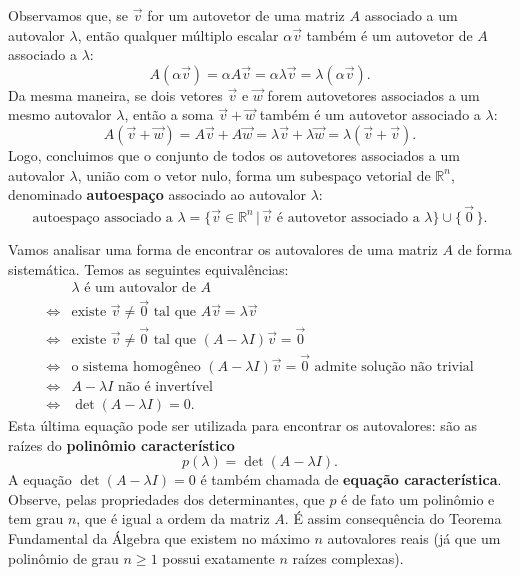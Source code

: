 Observamos que, se $\vec{v}$ for um autovetor de uma matriz $A$ associado a um autovalor $\lambda$, então qualquer múltiplo escalar $\alpha \vec{v}$ também é um autovetor de $A$ associado a $\lambda$:
\begin{equation}
A (\alpha \vec{v}) = \alpha A \vec{v} = \alpha \lambda \vec{v} = \lambda (\alpha \vec{v}).
\end{equation} Da mesma maneira, se dois vetores $\vec{v}$ e $\vec{w}$ forem autovetores associados a um mesmo autovalor $\lambda$, então a soma $\vec{v} + \vec{w}$ também é um autovetor associado a $\lambda$:
\begin{equation}
A (\vec{v} + \vec{w}) = A \vec{v} + A \vec{w} =  \lambda \vec{v} + \lambda \vec{w} = \lambda (\vec{v} + \vec{v}).
\end{equation} Logo, concluimos que o conjunto de todos os autovetores associados a um autovalor $\lambda$, união com o vetor nulo, forma um subespaço vetorial de $\mathbb{R}^n$, denominado \textbf{autoespaço} associado ao autovalor $\lambda$:
\begin{equation}
\text{autoespaço associado a } \lambda = \big\{ \vec{v} \in \mathbb{R}^n \, | \, \vec{v} \text{ é autovetor associado a } \lambda \big\} \cup \{\, \vec{0}\, \}.
\end{equation}

Vamos analisar uma forma de encontrar os autovalores de uma matriz $A$ de forma sistemática. Temos as seguintes equivalências:
\begin{align*}
& \lambda \text{ é um autovalor de $A$} \\
\iff & \text{existe } \vec{v} \neq \vec{0} \text{ tal que } A \vec{v} = \lambda \vec{v} \\
\iff & \text{existe } \vec{v} \neq \vec{0} \text{ tal que } (A - \lambda I)\vec{v} = \vec{0} \\
\iff & \text{o sistema homogêneo } (A - \lambda I)\vec{v} = \vec{0} \text{ admite solução não trivial} \\
\iff & A - \lambda I \text{ não é invertível} \\
\iff & \det (A - \lambda I) = 0.
\end{align*}
Esta última equação pode ser utilizada para encontrar os autovalores: são as raízes do \textbf{polinômio característico}
\begin{equation}
p(\lambda) = \det (A - \lambda I).
\end{equation} A equação $\det (A - \lambda I) = 0$ é também chamada de \textbf{equação característica}. Observe, pelas propriedades dos determinantes, que $p$ é de fato um polinômio e tem grau $n$, que é igual a ordem da matriz $A$. É assim consequência do Teorema Fundamental da Álgebra que existem no máximo $n$ autovalores reais (já que um polinômio de grau $n\ge 1$ possui exatamente $n$ raízes complexas).


